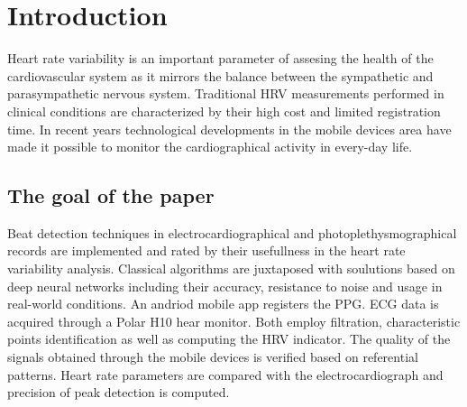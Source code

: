 \documentclass[journal]{IEEEtran}
\begin{document}
{\section{Introduction}
Heart rate variability is an important parameter of assesing the health of the cardiovascular system as it mirrors the balance between the sympathetic and parasympathetic nervous system. Traditional HRV measurements performed in clinical conditions are characterized by their high cost and limited registration time. In recent years technological developments in the mobile devices area have made it possible to monitor the cardiographical activity in every-day life.

\subsection{The goal of the paper}
Beat detection techniques in electrocardiographical and photoplethysmographical records are implemented and rated by their usefullness in the heart rate variability analysis. Classical algorithms are juxtaposed with soulutions based on deep neural networks including their accuracy, resistance to noise and usage in real-world conditions. An andriod mobile app registers the PPG. ECG data is acquired through a Polar H10 hear monitor. Both employ filtration, characteristic points identification as well as computing the HRV indicator. The quality of the signals obtained through the mobile devices is verified based on referential patterns. Heart rate parameters are compared with the electrocardiograph and precision of peak detection is computed.

}
\end{document}
